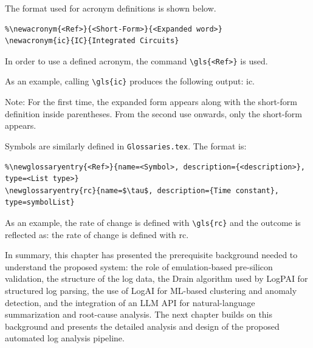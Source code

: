 The format used for acronym definitions is shown below.
\begin{verbatim}
%\newacronym{<Ref>}{<Short-Form>}{<Expanded word>}
\newacronym{ic}{IC}{Integrated Circuits}
\end{verbatim}
In order to use a defined acronym, the command \verb|\gls{<Ref>}| is used.

As an example, calling \verb|\gls{ic}| produces the following output: \gls{ic}.

Note: For the first time, the expanded form appears along with the short-form definition inside parentheses. From the second use onwards, only the short-form appears.

Symbols are similarly defined in \texttt{Glossaries.tex}. The format is:
\begin{verbatim}
%\newglossaryentry{<Ref>}{name=<Symbol>, description={<description>}, type=<List type>}
\newglossaryentry{rc}{name=$\tau$, description={Time constant}, type=symbolList}
\end{verbatim}

As an example, the rate of change is defined with \verb|\gls{rc}| and the outcome is reflected as: the rate of change is defined with \gls{rc}.

In summary, this chapter has presented the prerequisite background needed to understand the proposed system: the role of emulation-based pre-silicon validation, the structure of the log data, the Drain algorithm used by LogPAI for structured log parsing, the use of LogAI for ML-based clustering and anomaly detection, and the integration of an LLM API for natural-language summarization and root-cause analysis. The next chapter builds on this background and presents the detailed analysis and design of the proposed automated log analysis pipeline.
